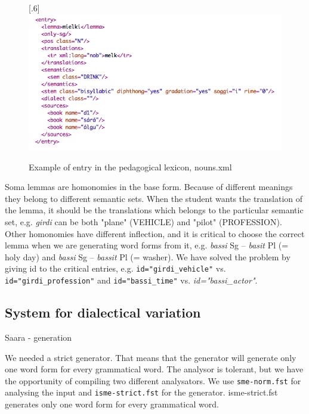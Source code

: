 \documentclass[a4paper,12pt]{article}
\begin{document}
\begin{figure}[htbp]
\begin{center}
\scalebox{.6}[.6]{\includegraphics{img/nounlexicon.png}}\\
\caption{Example of entry in the pedagogical lexicon, nouns.xml}
\label{nounlex}
\end{center}
\end{figure}

Soma lemmas are homonomies in the base form. Because of different meanings they belong to different semantic sets. When the student wants the translation of the lemma, it should be the translations which belongs to the particular semantic set, e.g. \textit{girdi} can be both "plane" (VEHICLE) and "pilot" (PROFESSION). Other homonomies have different inflection, and it is critical to choose the correct lemma when we are generating word forms from it, e.g. \textit{bassi} Sg -- \textit{basit} Pl (= holy day) and \textit{bassi} Sg -- \textit{bassit} Pl (= washer). We have solved the problem by giving id to the critical entries, e.g. \texttt{id="girdi\_vehicle"} vs. 
\texttt{id="girdi\_profession"} and \texttt{id="bassi\_time"} vs. \textit{id="bassi\_actor"}.


\subsection{System for dialectical variation}\label{dialect}
Saara - generation

We needed a strict generator. That means that the generator will generate only one word form for every grammatical word. The analysor is tolerant, but we have the opportunity of compiling two different analysators. We use \texttt{sme-norm.fst} for analysing the input and \texttt{isme-strict.fst} for the generator. isme-strict.fst generates only one word form for every grammatical word.
\end{document}
